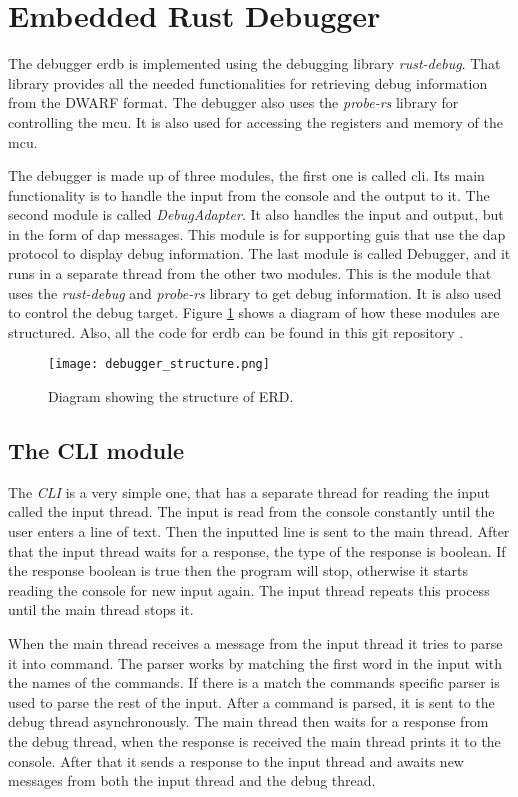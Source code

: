 \section{Embedded Rust Debugger}
The debugger \acrfull{erdb} is implemented using the debugging library \emph{rust-debug}.
That library provides all the needed functionalities for retrieving debug information from the \gls{DWARF} format.
The debugger also uses the \emph{probe-rs} library for controlling the \gls{mcu}.
It is also used for accessing the registers and memory of the \gls{mcu}.


The debugger is made up of three modules, the first one is called \acrshort{cli}.
Its main functionality is to handle the input from the console and the output to it.
The second module is called \emph{DebugAdapter}.
It also handles the input and output, but in the form of \gls{dap} messages.
This module is for supporting \glspl{gui} that use the \gls{dap} protocol to display debug information.
The last module is called Debugger, and it runs in a separate thread from the other two modules.
This is the module that uses the \emph{rust-debug} and \emph{probe-rs} library to get debug information.
It is also used to control the debug target.
Figure \ref{fig:ERDStruct} shows a diagram of how these modules are structured.
Also, all the code for \gls{erdb} can be found in this git repository \cite{erdb}.


\begin{figure}[h]
	\centering
	\texttt{[image: debugger\_structure.png]}
	\caption{Diagram showing the structure of ERD.}
	\label{fig:ERDStruct}
\end{figure}


\subsection{The CLI module}
The \emph{CLI} is a very simple one, that has a separate thread for reading the input called the input thread.
The input is read from the console constantly until the user enters a line of text.
Then the inputted line is sent to the main thread.
After that the input thread waits for a response, the type of the response is boolean.
If the response boolean is true then the program will stop, otherwise it starts reading the console for new input again.
The input thread repeats this process until the main thread stops it.


When the main thread receives a message from the input thread it tries to parse it into command.
The parser works by matching the first word in the input with the names of the commands.
If there is a match the commands specific parser is used to parse the rest of the input.
After a command is parsed, it is sent to the debug thread asynchronously.
The main thread then waits for a response from the debug thread, when the response is received the main thread prints it to the console.
After that it sends a response to the input thread and awaits new messages from both the input thread and the debug thread.


